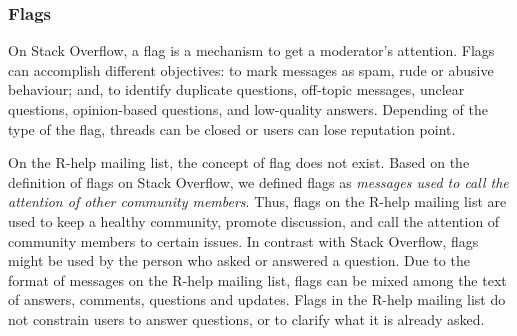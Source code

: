\subsubsection{Flags}

    On Stack Overflow, a flag is a mechanism to get a moderator's attention.
    Flags can accomplish different objectives: to mark messages as spam, rude or abusive behaviour; and, to identify duplicate questions, off-topic messages, unclear questions, opinion-based questions, and low-quality answers.
    Depending of the type of the flag, threads can be closed or users can lose reputation point.


On the R-help mailing list, the concept of flag does not exist. 
Based on the definition of flags on Stack Overflow, we defined flags as \emph{messages used to call the attention of other community members}.
Thus, flags on the R-help mailing list are used to keep a healthy community, promote discussion, and call the attention of community members to certain issues.
In contrast with Stack Overflow, flags might be used by the person who asked or answered a question.
Due to the format of messages on the R-help mailing list, flags can be mixed among the text of answers, comments, questions and updates.
    Flags in the R-help mailing list do not constrain users to answer questions, or to clarify what it is already asked.

